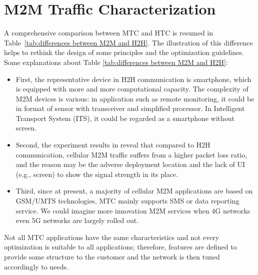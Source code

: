 \section{M2M Traffic Characterization}
\label{sec:overview-diff-traffic}
A comprehensive comparison between MTC and HTC is resumed in Table~\ref{tab:differences between M2M and H2H}.
The illustration of this difference helps to rethink the design of some principles and the optimization guidelines.
Some explanations about Table \ref{tab:differences between M2M and H2H}: 
\begin{itemize}[leftmargin=*, noitemsep]
	\item First, the representative device in H2H communication is smartphone, which is equipped with more and more computational capacity. The complexity of M2M devices is various: in application such as remote monitoring, it could be in format of sensor with transceiver and simplified processor. In Intelligent Transport System (ITS), it could be regarded as a smartphone without screen.
	\item Second, the experiment results in \cite{FirstLook12} reveal that compared to H2H communication, cellular M2M traffic suffers from a higher packet loss ratio, and the reason may be the adverse deployment location and the lack of UI (e.g., screen) to show the signal strength in its place. 
	\item Third, since at present, a majority of cellular M2M applications are based on GSM/UMTS technologies, MTC mainly supports SMS or data reporting service. We could imagine more innovation M2M services when 4G networks even 5G networks are largely rolled out.
\end{itemize}

Not all MTC applications have the same characteristics and not every optimization is suitable to all applications; therefore, features are defined to provide some structure to the customer and the network is then tuned accordingly to needs.

